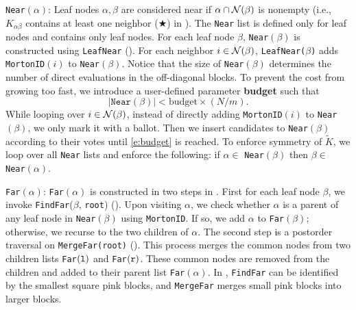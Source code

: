  \texttt{Near}$(\alpha)$:
Leaf nodes $\alpha, \beta$ are considered near if 
$\alpha \cap {\mathcal N}(\beta)$ is nonempty
(i.e., $K_{\alpha \beta}$ contains at least one neighbor 
($\bigstar$) in ). The \texttt{Near} list is defined only for leaf nodes and contains only leaf nodes.  For each leaf node $\beta$, \texttt{Near}$(\beta)$ is constructed
using \texttt{LeafNear} (). For each neighbor $i\in{\mathcal N}(\beta)$, \texttt{LeafNear($\beta$)}  adds \texttt{MortonID}$(i)$ to \texttt{Near}$(\beta)$. 
Notice that the size of \texttt{Near}$(\beta)$ determines the number
of direct evaluations in the off-diagonal blocks. To prevent the cost from growing too fast,
we introduce a user-defined parameter \textbf{budget} such that
\begin{equation}
  \lvert \mathtt{Near}(\beta)\rvert < \mathrm{budget} \times (N/m). 
\label{e:budget}
\end{equation}
While looping over $i\in{\mathcal N}(\beta)$, instead of directly adding \texttt{MortonID}$(i)$
to \texttt{Near}$(\beta)$, we only mark it with a ballot.
Then we insert candidates to \texttt{Near}$(\beta)$ according to their votes
until \eqref{e:budget} is reached.
To enforce symmetry of $\tilde{K}$, we loop over all \texttt{Near} lists and enforce the following:
if $\alpha \in$ \texttt{Near}$(\beta)$ then $\beta \in$ \texttt{Near}$(\alpha)$.


 \texttt{Far}$(\alpha)$:
\texttt{Far}$(\alpha)$ is constructed in two steps in .
First for each leaf node $\beta$, we invoke \texttt{FindFar}($\beta$, \texttt{root}) ().
Upon visiting $\alpha$, we check whether $\alpha$ is a parent of any 
leaf node in \texttt{Near}$(\beta)$ using \texttt{MortonID}.
If so, we add $\alpha$ to \texttt{Far}$(\beta)$; otherwise, we recurse to the 
two children of $\alpha$.
The second step is a postorder traversal on \texttt{MergeFar(root)}
().
This process merges the common nodes from two children lists \texttt{Far}$({\tt l})$ and \texttt{Far}$({\tt r})$.
These common nodes are removed from the children and added to 
their parent list \texttt{Far}$(\alpha)$.
In , 
\texttt{FindFar} can be identified by the smallest square pink blocks, 
and \texttt{MergeFar} merges small pink blocks into larger blocks.

